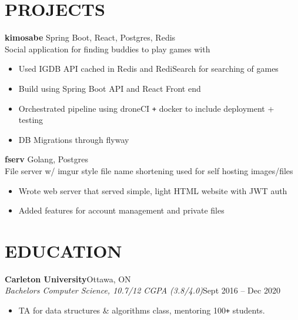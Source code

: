 \documentclass[letterpaper]{article}
\newcommand{\NewPart}[1]{\section*{\large\uppercase{\textbf{#1}}}}
\newcommand{\JobEntry}[3]{
	\normalsize\textbf{#1}\hfill\normalsize{#2}\\
	#3\vspace{0.1cm}
}
\newcommand{\DatedEntry}[3]{
	\small\textit{#1}\hfill\small{#2}\\
	\vspace{0.1cm}#3\vspace{0.1cm}
}
\newcommand{\ProjectEntry}[4]{\textbf{#1}
	\hfill \small{#2}\\
	#3\\\vspace{0.1cm}
	#4\vspace{0.1cm}
}
\begin{document}
\NewPart{Projects}
\ProjectEntry{kimosabe}
{Spring Boot, React, Postgres, Redis}
{Social application for finding buddies to play games with}
{\begin{itemize}
	\item Used IGDB API cached in Redis and RediSearch for searching of games
	\item Build using Spring Boot API and React Front end
	\item Orchestrated pipeline using droneCI \texttt{+} docker to include deployment + testing
	\item DB Migrations through flyway
\end{itemize}}
\ProjectEntry{fserv}
{Golang, Postgres}
{File server w/ imgur style file name shortening used for self hosting images/files}
{\begin{itemize}
	\item Wrote web server that served simple, light HTML website with JWT auth
	\item Added features for account management and private files
\end{itemize}}\vspace{-0.3cm}

\NewPart{Education}
\JobEntry {Carleton University} {Ottawa, ON}
{\DatedEntry
{Bachelors Computer Science, 10.7/12 CGPA (3.8/4.0)}
{Sept 2016 -- Dec 2020}
{\begin{itemize}
	\item TA for data structures \& algorithms class, mentoring 100\texttt{+} students.
\end{itemize}}
}
\end{document}
